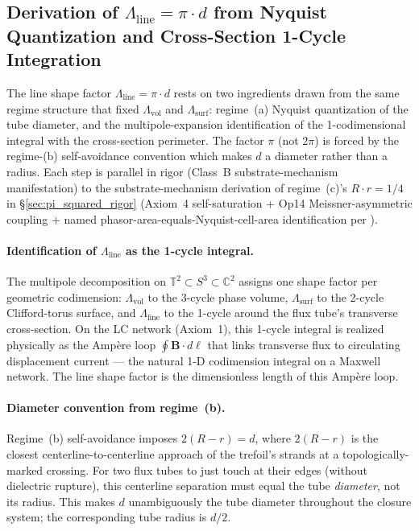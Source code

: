 \subsection{Derivation of $\Lambda_{\text{line}} = \pi \cdot d$ from Nyquist Quantization and Cross-Section 1-Cycle Integration}
\label{sec:lambda_line_rigor}

The line shape factor $\Lambda_{\text{line}} = \pi \cdot d$ rests on two ingredients drawn from the same regime structure that fixed $\Lambda_{\text{vol}}$ and $\Lambda_{\text{surf}}$: regime~(a) Nyquist quantization of the tube diameter, and the multipole-expansion identification of the 1-codimensional integral with the cross-section perimeter. The factor $\pi$ (not $2\pi$) is forced by the regime-(b) self-avoidance convention which makes $d$ a diameter rather than a radius. Each step is parallel in rigor (Class~B substrate-mechanism manifestation) to the substrate-mechanism derivation of regime~(c)'s $R \cdot r = 1/4$ in \S\ref{sec:pi_squared_rigor} (Axiom~4 self-saturation + Op14 Meissner-asymmetric coupling + named phasor-area-equals-Nyquist-cell-area identification per ).

\paragraph{Identification of $\Lambda_{\text{line}}$ as the 1-cycle integral.}
The multipole decomposition on $\mathbb{T}^2 \subset S^3 \subset \mathbb{C}^2$ assigns one shape factor per geometric codimension: $\Lambda_{\text{vol}}$ to the 3-cycle phase volume, $\Lambda_{\text{surf}}$ to the 2-cycle Clifford-torus surface, and $\Lambda_{\text{line}}$ to the 1-cycle around the flux tube's transverse cross-section. On the LC network (Axiom~1), this 1-cycle integral is realized physically as the Amp\`ere loop $\oint \mathbf{B} \cdot d\boldsymbol{\ell}$ that links transverse flux to circulating displacement current --- the natural 1-D codimension integral on a Maxwell network. The line shape factor is the dimensionless length of this Amp\`ere loop.

\paragraph{Diameter convention from regime~(b).}
Regime~(b) self-avoidance imposes $2(R - r) = d$, where $2(R - r)$ is the closest centerline-to-centerline approach of the trefoil's strands at a topologically-marked crossing. For two flux tubes to just touch at their edges (without dielectric rupture), this centerline separation must equal the tube \emph{diameter}, not its radius. This makes $d$ unambiguously the tube diameter throughout the closure system; the corresponding tube radius is $d/2$.

